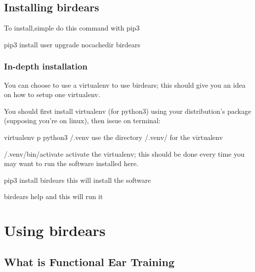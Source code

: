 \documentclass[letterpaper,10pt,english]{sphinxmanual}
\begin{document}
\section{Installing birdears}
\label{\detokenize{index:id1}}
To install,simple do this command with pip3

\begin{sphinxVerbatim}[commandchars=\\\{\}]
pip3 install \PYGZhy{}\PYGZhy{}user \PYGZhy{}\PYGZhy{}upgrade \PYGZhy{}\PYGZhy{}no\PYGZhy{}cache\PYGZhy{}dir birdears
\end{sphinxVerbatim}


\subsection{In-depth installation}
\label{\detokenize{index:in-depth-installation}}
You can choose to use a virtualenv to use birdears; this should give you
an idea on how to setup one virtualenv.

You should first install virtualenv (for python3) using your
distribution’s package (supposing you’re on linux), then issue on terminal:

\begin{sphinxVerbatim}[commandchars=\\\{\}]
virtualenv \PYGZhy{}p python3 \PYGZti{}/.venv \PYGZsh{} use the directory \PYGZti{}/.venv/ for the virtualenv

\PYGZti{}/.venv/bin/activate          \PYGZsh{} activate the virtualenv; this should be done
                              \PYGZsh{} every time you may want to run the software
                              \PYGZsh{} installed here.

pip3 install birdears         \PYGZsh{} this will install the software

birdears \PYGZhy{}\PYGZhy{}help               \PYGZsh{} and this will run it
\end{sphinxVerbatim}


\chapter{Using birdears}
\label{\detokenize{index:using-birdears}}

\section{What is Functional Ear Training}
\label{\detokenize{index:what-is-functional-ear-training}}
\end{document}
